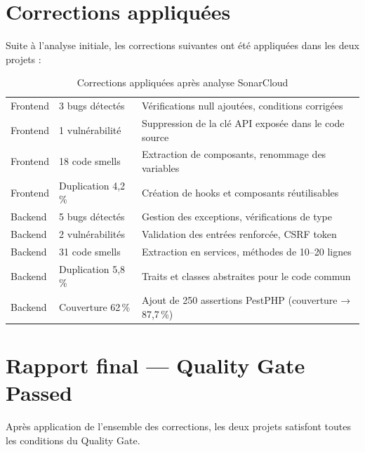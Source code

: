 \section{Corrections appliquées}

Suite à l'analyse initiale, les corrections suivantes ont été appliquées dans les
deux projets :

\begin{table}[H]
  \centering
  \caption{Corrections appliquées après analyse SonarCloud}
  \label{tab:corrections_sonar}
  \begin{tabularx}{\textwidth}{L{3cm}L{4cm}X}
    \toprule
     &  &  \\
    \midrule
    Frontend & 3 bugs détectés & Vérifications null ajoutées, conditions corrigées \\
    Frontend & 1 vulnérabilité & Suppression de la clé API exposée dans le code source \\
    Frontend & 18 code smells  & Extraction de composants, renommage des variables \\
    Frontend & Duplication 4,2\,\% & Création de hooks et composants réutilisables \\
    Backend  & 5 bugs détectés & Gestion des exceptions, vérifications de type \\
    Backend  & 2 vulnérabilités & Validation des entrées renforcée, CSRF token \\
    Backend  & 31 code smells  & Extraction en services, méthodes de 10--20 lignes \\
    Backend  & Duplication 5,8\,\% & Traits et classes abstraites pour le code commun \\
    Backend  & Couverture 62\,\% & Ajout de 250 assertions PestPHP (couverture → 87,7\,\%) \\
    \bottomrule
  \end{tabularx}
\end{table}

\section{Rapport final — Quality Gate Passed}

Après application de l'ensemble des corrections, les deux projets satisfont toutes
les conditions du Quality Gate.

